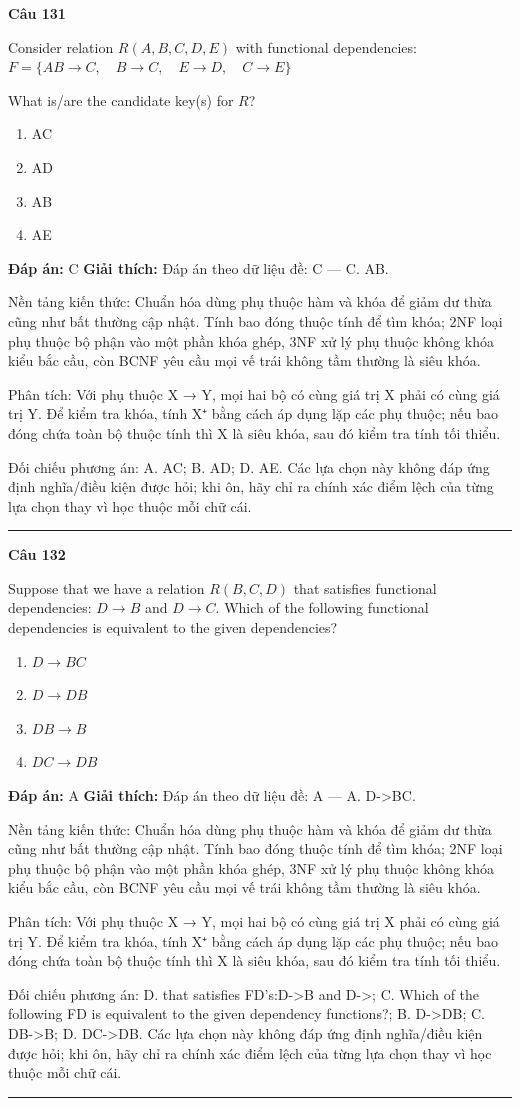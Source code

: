 \documentclass[11pt,a4paper]{article}
\newenvironment{question}[1]{%
  \par\vspace{1em}\noindent\textbf{\large Câu #1}\par\vspace{0.4em}
}{%
  \par\vspace{1em}\hrule\vspace{0.6em}
}
\newenvironment{choices}{%
  \begin{enumerate}[label=\textbf{\Alph*.},leftmargin=2.2em,itemsep=2pt,topsep=3pt]
}{%
  \end{enumerate}
}
\newcommand{\choice}{\item}
\begin{document}
\begin{question}{131}
Consider relation \(R(A, B, C, D, E)\) with functional dependencies:
\(F = \{ AB \rightarrow C, \quad B \rightarrow C, \quad E \rightarrow D, \quad C \rightarrow E \}\)

What is/are the candidate key(s) for \(R\)?
\begin{choices}
\choice AC
\choice AD
\choice AB
\choice AE
\end{choices}
\textbf{Đáp án:} C
\textbf{Giải thích:} Đáp án theo dữ liệu đề: C — C. AB.

Nền tảng kiến thức: Chuẩn hóa dùng phụ thuộc hàm và khóa để giảm dư thừa cũng như bất thường cập nhật. Tính bao đóng thuộc tính để tìm khóa; 2NF loại phụ thuộc bộ phận vào một phần khóa ghép, 3NF xử lý phụ thuộc không khóa kiểu bắc cầu, còn BCNF yêu cầu mọi vế trái không tầm thường là siêu khóa.

Phân tích: Với phụ thuộc X → Y, mọi hai bộ có cùng giá trị X phải có cùng giá trị Y. Để kiểm tra khóa, tính X⁺ bằng cách áp dụng lặp các phụ thuộc; nếu bao đóng chứa toàn bộ thuộc tính thì X là siêu khóa, sau đó kiểm tra tính tối thiểu.

Đối chiếu phương án: A. AC; B. AD; D. AE. Các lựa chọn này không đáp ứng định nghĩa/điều kiện được hỏi; khi ôn, hãy chỉ ra chính xác điểm lệch của từng lựa chọn thay vì học thuộc mỗi chữ cái.
\end{question}

\begin{question}{132}
Suppose that we have a relation \(R(B, C, D)\) that satisfies functional dependencies: \(D \rightarrow B\) and \(D \rightarrow C\). Which of the following functional dependencies is equivalent to the given dependencies?
\begin{choices}
\choice \(D \rightarrow BC\)
\choice \(D \rightarrow DB\)
\choice \(DB \rightarrow B\)
\choice \(DC \rightarrow DB\)
\end{choices}
\textbf{Đáp án:} A
\textbf{Giải thích:} Đáp án theo dữ liệu đề: A — A. D->BC.

Nền tảng kiến thức: Chuẩn hóa dùng phụ thuộc hàm và khóa để giảm dư thừa cũng như bất thường cập nhật. Tính bao đóng thuộc tính để tìm khóa; 2NF loại phụ thuộc bộ phận vào một phần khóa ghép, 3NF xử lý phụ thuộc không khóa kiểu bắc cầu, còn BCNF yêu cầu mọi vế trái không tầm thường là siêu khóa.

Phân tích: Với phụ thuộc X → Y, mọi hai bộ có cùng giá trị X phải có cùng giá trị Y. Để kiểm tra khóa, tính X⁺ bằng cách áp dụng lặp các phụ thuộc; nếu bao đóng chứa toàn bộ thuộc tính thì X là siêu khóa, sau đó kiểm tra tính tối thiểu.

Đối chiếu phương án: D. that satisfies FD's:D->B and D->; C. Which of the following FD is equivalent to the given dependency functions?; B. D->DB; C. DB->B; D. DC->DB. Các lựa chọn này không đáp ứng định nghĩa/điều kiện được hỏi; khi ôn, hãy chỉ ra chính xác điểm lệch của từng lựa chọn thay vì học thuộc mỗi chữ cái.
\end{question}
\end{document}
